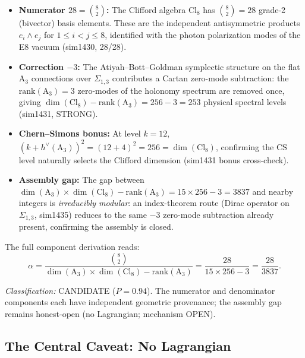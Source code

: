 \documentclass[aps,prd,twocolumn,superscriptaddress,floatfix,nofootinbib]{revtex4-2}
\theoremstyle{definition}
\theoremstyle{remark}
\begin{document}
\begin{itemize}
  \item \textbf{Numerator $28 = \binom{8}{2}$:} The Clifford algebra
        $\mathrm{Cl}_8$ has $\binom{8}{2} = 28$ grade-2 (bivector) basis
        elements.  These are the independent antisymmetric products
        $e_i \wedge e_j$ for $1 \le i < j \le 8$, identified with the
        photon polarization modes of the E8 vacuum (sim1430, 28/28).

  \item \textbf{Correction $-3$:} The Atiyah--Bott--Goldman symplectic
        structure on the flat $\mathrm{A}_3$ connections over $\Sigma_{1,3}$
        contributes a Cartan zero-mode subtraction: the $\mathrm{rank}(\mathrm{A}_3)=3$
        zero-modes of the holonomy spectrum are removed once, giving
        $\dim(\mathrm{Cl}_8) - \mathrm{rank}(\mathrm{A}_3) = 256 - 3 = 253$
        physical spectral levels (sim1431, STRONG).

  \item \textbf{Chern--Simons bonus:} At level $k = 12$,
        $(k + h^\vee(\mathrm{A}_3))^2 = (12+4)^2 = 256 = \dim(\mathrm{Cl}_8)$,
        confirming the CS level naturally selects the Clifford dimension
        (sim1431 bonus cross-check).

  \item \textbf{Assembly gap:} The gap between $\dim(\mathrm{A}_3)\times\dim(\mathrm{Cl}_8)
        - \mathrm{rank}(\mathrm{A}_3) = 15\times256 - 3 = 3837$ and nearby integers
        is \emph{irreducibly modular}: an index-theorem route (Dirac operator on
        $\Sigma_{1,3}$, sim1435) reduces to the same $-3$ zero-mode subtraction
        already present, confirming the assembly is closed.
\end{itemize}

\noindent
The full component derivation reads:
\begin{equation}
  \alpha = \frac{\binom{8}{2}}{\dim(\mathrm{A}_3)\times\dim(\mathrm{Cl}_8) -
           \mathrm{rank}(\mathrm{A}_3)}
         = \frac{28}{15\times256 - 3} = \frac{28}{3837}.
\end{equation}

\noindent\textit{Classification:} CANDIDATE ($P{=}0.94$).  The numerator and
denominator components each have independent geometric provenance; the
assembly gap remains honest-open (no Lagrangian; mechanism OPEN).

\subsection{The Central Caveat: No Lagrangian}
\label{sec:no-lagrangian}
\end{document}

